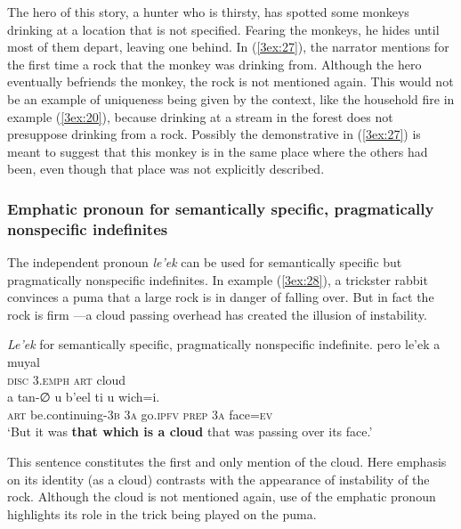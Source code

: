 \documentclass[output=paper]{langsci/langscibook}
\begin{document}
The hero of this story, a hunter who is thirsty, has spotted some monkeys drinking at a location that is not specified.  Fearing the monkeys, he hides until most of them depart, leaving one behind.  In (\ref{3ex:27}), the narrator mentions for the first time a rock that the monkey was drinking from.  Although the hero eventually befriends the monkey, the rock is not mentioned again.  This would not be an example of uniqueness being given by the context, like the household fire in example (\ref{3ex:20}), because drinking at a stream in the forest does not presuppose drinking from a rock.  Possibly the demonstrative in (\ref{3ex:27}) is meant to suggest that this monkey is in the same place where the others had been, even though that place was not explicitly described.


\subsubsection{Emphatic pronoun for semantically specific, pragmatically nonspecific indefinites}\label{3sec:343}

The independent pronoun {\emph{le'ek}} can be used for semantically specific but pragmatically nonspecific indefinites. In example (\ref{3ex:28}), a trickster rabbit convinces a puma that a large rock is in danger of falling over. But in fact the rock is firm ---a cloud passing overhead has created the illusion of instability.

\begin{exe}
\ex\label{3ex:28}
{\emph{Le'ek}} for semantically specific, pragmatically nonspecific indefinite. 
\exi{}
\gll	pero			le'ek 			a	muyal \\
	{\textsc{disc}}		3.{\textsc{emph}}	{\textsc{art}}	cloud \\
\glt
\exi{}
\gll	a 	tan-{∅}				u		b’eel			ti			u		wich=i. \\
	{\textsc{art}}	be.continuing-{\textsc{3b}}	{\textsc{3a}}	go.{\textsc{ipfv}}	{\textsc{prep}}		{\textsc{3a}}	face={\textsc{ev}} \\
\glt	`But it was {\textbf{that which is a cloud}} that was passing over its face.'
\end{exe}

This sentence constitutes the first and only mention of the cloud. Here emphasis on its identity (as a cloud) contrasts with the appearance of instability of the rock. Although the cloud is not mentioned again, use of the emphatic pronoun highlights its role in the trick being played on the puma.
\end{document}
